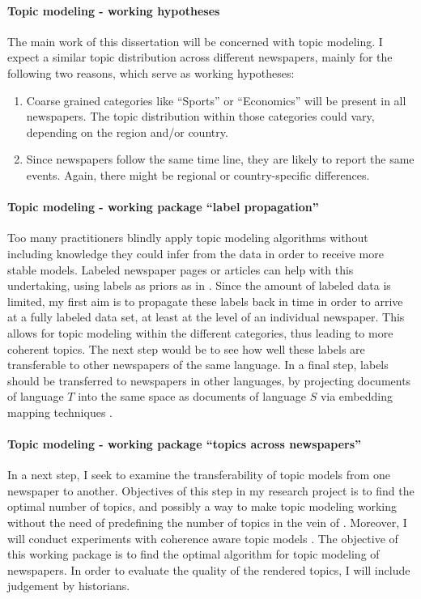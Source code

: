 \paragraph{Topic modeling - working hypotheses} The main work of this dissertation will be concerned with topic modeling. I expect a similar topic distribution across different newspapers, mainly for the following two reasons, which serve as working hypotheses:

\begin{enumerate}
    \item Coarse grained categories like ``Sports'' or ``Economics'' will be present in all newspapers. The topic distribution within those categories could vary, depending on the region and/or country.
    \item Since newspapers follow the same time line, they are likely to report the same events. Again, there might be regional or country-specific differences. 
\end{enumerate}

\paragraph{Topic modeling - working package ``label propagation''} Too many practitioners blindly apply topic modeling algorithms without including knowledge they could infer from the data in order to receive more stable models. Labeled newspaper pages or articles can help with this undertaking, using labels as priors as in \citet{kang2013}. Since the amount of labeled data is limited, my first aim is to propagate these labels back in time in order to arrive at a fully labeled data set, at least at the level of an individual newspaper. This allows for topic modeling within the different categories, thus leading to more coherent topics. The next step would be to see how well these labels are transferable to other newspapers of the same language. In a final step, labels should be transferred to newspapers in other languages, by projecting documents of language $T$ into the same space as documents of language $S$ via embedding mapping techniques \citet{artetxe2018aaai}.

\paragraph{Topic modeling - working package ``topics across newspapers''} In a next step, I seek to examine the transferability of topic models from one newspaper to another. Objectives of this step in my research project is to find the optimal number of topics, and possibly a way to make topic modeling working without the need of predefining the number of topics in the vein of \citet{miao_neural_2016}. Moreover, I will conduct experiments with coherence aware topic models \citep{2018arXiv180902687D}. The objective of this working package is to find the optimal algorithm for topic modeling of newspapers. In order to evaluate the quality of the rendered topics, I will include judgement by historians. 

